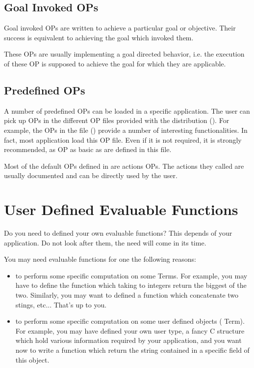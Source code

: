\subsection{Goal Invoked OPs}

Goal invoked OPs are written to achieve a particular goal or objective.
Their success is equivalent to achieving the goal which invoked them.

These OPs are usually implementing a goal directed behavior, i.e. the execution
of these OP is supposed to achieve the goal for which they are applicable.

\subsection{Predefined OPs}

A number of predefined OPs can be loaded in a specific application. The user
can pick up OPs in the different OP files provided with the distribution
(). For example, the OPs in the file 
() provide a number of interesting functionalities. In
fact, most application load this OP file.  Even if it is not required, it is
strongly recommended, as OP as basic as \code{=} are defined in this file.

Most of the default OPs defined in   are actions OPs. The
actions they called are usually documented and can be directly used by the
user.

\section{User Defined Evaluable Functions}

Do you need to defined your own evaluable functions? This depends of your
application. Do not look after them, the need will come in its time.

You may need evaluable functions for one the following reasons:

\begin{itemize}

\item to perform some specific computation on some Terms. For example,
you may have to define the  function which taking to integers
return the biggest of the two. Similarly, you may want to defined a
function which concatenate two stings, etc... That's up to you.

\item to perform some specific computation on some user defined objects
( Term). For example, you may have defined your own user type, a
fancy C structure which hold various information required by your
application, and you want now to write a function which return the string
contained in a specific field of this object.

\end{itemize}

